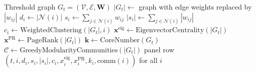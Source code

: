 \documentclass{article}
\begin{document}
\begin{algorithm}[H]
\caption{Node-Level Network Feature Extraction}
\label{alg:node}
\begin{algorithmic}[1]
\Require Threshold graph $G_t = (\mathcal{V}, \mathcal{E}, \mathbf{W})$
\State $|G_t| \leftarrow $ graph with edge weights replaced by $|w_{ij}|$
    \State $d_i \leftarrow |\mathcal{N}(i)|$ 
    \State $s_i \leftarrow \sum_{j \in \mathcal{N}(i)} w_{ij}$ 
    \State $|s_i| \leftarrow \sum_{j \in \mathcal{N}(i)} |w_{ij}|$ 
    \State $c_i \leftarrow \text{WeightedClustering}(|G_t|, i)$
\EndFor
\State $\mathbf{x}^{\text{eig}} \leftarrow \text{EigenvectorCentrality}(|G_t|)$
\State $\mathbf{x}^{\text{PR}} \leftarrow \text{PageRank}(|G_t|)$
\State $\mathbf{k} \leftarrow \text{CoreNumber}(G_t)$ 
\State $\mathcal{C} \leftarrow \text{GreedyModularityCommunities}(|G_t|)$
\State \Return panel row $(t, i, d_i, s_i, |s_i|, c_i, x_i^{\text{eig}}, x_i^{\text{PR}}, k_i, \text{comm}(i))$ for all $i$
\end{algorithmic}
\end{algorithm}
\end{document}
